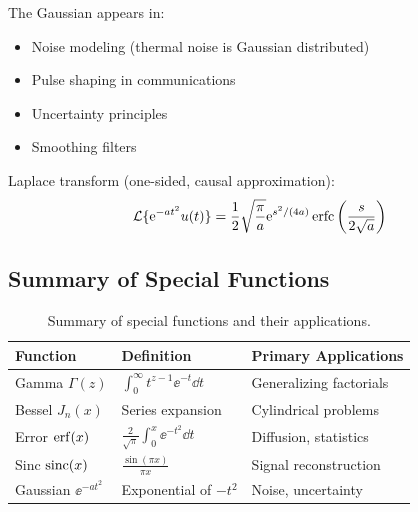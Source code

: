 The Gaussian appears in:
\begin{itemize}
    \item Noise modeling (thermal noise is Gaussian distributed)
    \item Pulse shaping in communications
    \item Uncertainty principles
    \item Smoothing filters
\end{itemize}

Laplace transform (one-sided, causal approximation):
\begin{equation}
\mathcal{L}\{\mathrm{e}^{-at^2}u(t)\} = \frac{1}{2}\sqrt{\frac{\pi}{a}}\mathrm{e}^{s^2/(4a)}\operatorname{erfc}\left(\frac{s}{2\sqrt{a}}\right)
\end{equation}

\subsection{Summary of Special Functions}

\begin{table}[htbp]
\centering
\begin{tabular}{lll}
\toprule
\textbf{Function} & \textbf{Definition} & \textbf{Primary Applications} \\
\midrule
Gamma $\Gamma(z)$ & $\int_0^\infty t^{z-1}\ee^{-t}\dd t$ & Generalizing factorials \\
Bessel $J_n(x)$ & Series expansion & Cylindrical problems \\
Error $\operatorname{erf}(x)$ & $\frac{2}{\sqrt{\pi}}\int_0^x \ee^{-t^2}\dd t$ & Diffusion, statistics \\
Sinc $\operatorname{sinc}(x)$ & $\frac{\sin(\pi x)}{\pi x}$ & Signal reconstruction \\
Gaussian $\ee^{-at^2}$ & Exponential of $-t^2$ & Noise, uncertainty \\
\bottomrule
\end{tabular}
\caption{Summary of special functions and their applications.}
\label{tab:special_functions}
\end{table}

